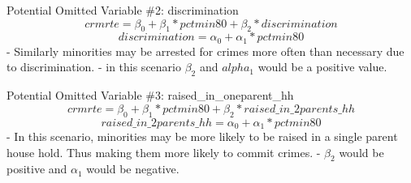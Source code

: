 \documentclass[]{article}
\begin{document}
Potential Omitted Variable \#2: discrimination
\[ crmrte = \beta_0 + \beta_1*pctmin80 + \beta_2*discrimination \]
\[ discrimination = \alpha_0 + \alpha_1*pctmin80 \] - Similarly
minorities may be arrested for crimes more often than necessary due to
discrimination. - in this scenario \(\beta_2\) and \(alpha_1\) would be
a positive value.

Potential Omitted Variable \#3: raised\_in\_oneparent\_hh
\[ crmrte = \beta_0 + \beta_1*pctmin80 + \beta_2*raised\_in\_2parents\_hh \]
\[ raised\_in\_2parents\_hh = \alpha_0 + \alpha_1*pctmin80 \] - In this
scenario, minorities may be more likely to be raised in a single parent
house hold. Thus making them more likely to commit crimes. - \(\beta_2\)
would be positive and \(\alpha_1\) would be negative.
\end{document}
